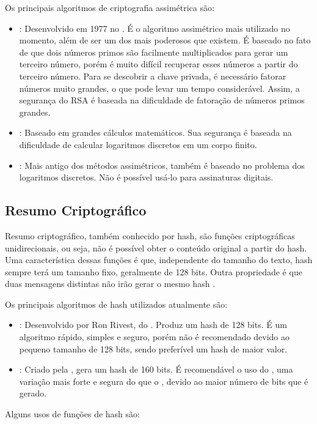 Os principais algoritmos de criptografia assimétrica são:
\begin{itemize}
    \item \rsa: Desenvolvido em 1977 no \mitt. É o algoritmo assimétrico mais utilizado no momento, além de ser um dos mais poderosos que existem. É baseado no fato de que dois números primos são facilmente multiplicados para gerar um terceiro número, porém é muito difícil recuperar esses números a partir do terceiro número. Para se descobrir a chave privada, é necessário fatorar números muito grandes, o que pode levar um tempo considerável. Assim, a segurança do RSA é baseada na dificuldade de fatoração de números primos grandes.
    \item \elgamal: Baseado em grandes cálculos matemáticos. Sua segurança é baseada na dificuldade de calcular logaritmos discretos em um corpo finito.
    \item \dhes: Mais antigo dos métodos assimétricos, também é baseado no problema dos logaritmos discretos. Não é possível usá-lo para assinaturas digitais.
\end{itemize}

\subsection{Resumo Criptográfico}

Resumo criptográfico, também conhecido por hash, são funções criptográficas unidirecionais, ou seja, não é possível obter o conteúdo original a partir do hash. Uma característica dessas funções é que, independente do tamanho do texto, hash sempre terá um tamanho fixo, geralmente de 128 bits. Outra propriedade é que duas mensagens distintas não irão gerar o mesmo hash \cite{Pfleeger2015}.

Os principais algoritmos de hash utilizados atualmente são:
\begin{itemize}
    \item \mdd: Desenvolvido por Ron Rivest, do \mitt. Produz um hash de 128 bits. É um algoritmo rápido, simples e seguro, porém não é recomendado devido ao pequeno tamanho de 128 bits, sendo preferível um hash de maior valor.
    \item \sha: Criado pela \nsa, gera um hash de 160 bits. É recomendável o uso do , uma variação mais forte e segura do que o , devido ao maior número de bits que é gerado.
\end{itemize}

Alguns usos de funções de hash são:

